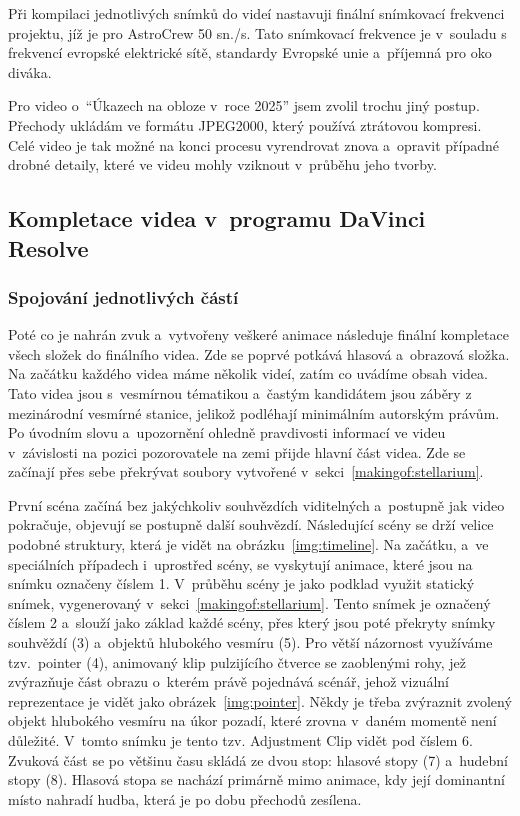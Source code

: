 \documentclass[12pt,a4paper,titlepage]{article}
\begin{document}
Při kompilaci jednotlivých snímků do videí nastavuji finální snímkovací frekvenci projektu, jíž je pro AstroCrew 50 sn./s. Tato snímkovací frekvence je v~souladu s frekvencí evropské elektrické sítě, standardy Evropské unie a~příjemná pro oko diváka.

Pro video o~\enquote{Úkazech na obloze v~roce 2025} jsem zvolil trochu jiný postup. Přechody ukládám ve formátu JPEG2000, který používá ztrátovou kompresi. Celé video je tak možné na konci procesu vyrendrovat znova a~opravit případné drobné detaily, které ve videu mohly vziknout v~průběhu jeho tvorby.
\subsection{Kompletace videa v~programu DaVinci Resolve}\label{makingof:resolve}
\subsubsection{Spojování jednotlivých částí}\label{makingof:resolve:merging}
Poté co je nahrán zvuk a~vytvořeny veškeré animace následuje finální kompletace všech složek do finálního videa. Zde se poprvé potkává hlasová a~obrazová složka. Na začátku každého videa máme několik videí, zatím co uvádíme obsah videa. Tato videa jsou s~vesmírnou tématikou a~častým kandidátem jsou záběry z mezinárodní vesmírné stanice, jelikož podléhají minimálním autorským právům. Po úvodním slovu a~upozornění ohledně pravdivosti informací ve videu v~závislosti na pozici pozorovatele na zemi přijde hlavní část videa. Zde se začínají přes sebe překrývat soubory vytvořené v~sekci~\ref{makingof:stellarium}.

První scéna začíná bez jakýchkoliv souhvězdích viditelných a~postupně jak video pokračuje, objevují se postupně další souhvězdí. Následující scény se drží velice podobné struktury, která je vidět na obrázku~\ref{img:timeline}. Na začátku, a~ve speciálních případech i~uprostřed scény, se vyskytují animace, které jsou na snímku označeny číslem 1. V~průběhu scény je jako podklad využit statický snímek, vygenerovaný v~sekci~\ref{makingof:stellarium}. Tento snímek je označený číslem 2 a~slouží jako základ každé scény, přes který jsou poté překryty snímky souhvěždí (3) a~objektů hlubokého vesmíru (5). Pro větší názornost využíváme tzv.\ pointer (4), animovaný klip pulzijícího čtverce se zaoblenými rohy, jež zvýrazňuje část obrazu o~kterém právě pojednává scénář, jehož vizuální reprezentace je vidět jako obrázek~\ref{img:pointer}. Někdy je třeba zvýraznit zvolený objekt hlubokého vesmíru na úkor pozadí, které zrovna v~daném momentě není důležité. V~tomto snímku je tento tzv. Adjustment Clip vidět pod číslem 6. Zvuková část se po většinu času skládá ze dvou stop: hlasové stopy (7) a~hudební stopy (8). Hlasová stopa se nachází primárně mimo animace, kdy její dominantní místo nahradí hudba, která je po dobu přechodů zesílena.
\end{document}

